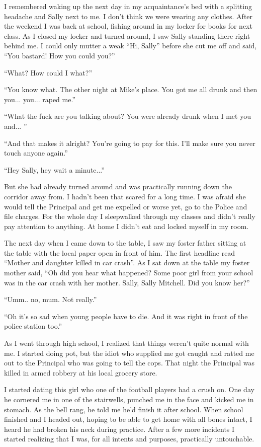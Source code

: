 \documentclass[11pt,letterpaper]{article}
\begin{document}
I remembered waking up the next day in my acquaintance's bed with a splitting headache and Sally next to me. I don't think we were wearing any clothes. After the weekend I was back at school, fishing around in my locker for books for next class. As I closed my locker and turned around, I saw Sally standing there right behind me. I could only mutter a weak ``Hi, Sally'' before she cut me off and said, ``You bastard! How you could you?''

``What? How could I what?''

``You know what. The other night at Mike's place. You got me all drunk and then you... you... raped me.''

``What the fuck are you talking about? You were already drunk when I met you and... ''

``And that makes it alright? You're going to pay for this. I'll make sure you never touch anyone again.''

``Hey Sally, hey wait a minute...''

But she had already turned around and was practically running down the corridor away from. I hadn't been that scared for a long time. I was afraid she would tell the Principal and get me expelled or worse yet, go to the Police and file charges. For the whole day I sleepwalked through my classes and didn't really pay attention to anything. At home I didn't eat and locked myself in my room.

The next day when I came down to the table, I saw my foster father sitting at the table with the local paper open in front of him. The first headline read ``Mother and daughter killed in car crash''. As I sat down at the table my foster mother said, ``Oh did you hear what happened? Some poor girl from your school was in the car crash with her mother. Sally, Sally Mitchell. Did you know her?''

``Umm.. no, mum. Not really.''

``Oh it's so sad when young people have to die. And it was right in front of the police station too.''


As I went through high school, I realized that things weren't quite normal with me. I started doing pot, but the idiot who supplied me got caught and ratted me out to the Principal who was going to tell the cops. That night the Principal was killed in armed robbery at his local grocery store. 

I started dating this girl who one of the football players had a crush on. One day he cornered me in one of the stairwells, punched me in the face and kicked me in stomach. As the bell rang, he told me he'd finish it after school. When school finished and I headed out, hoping to be able to get home with all bones intact, I heard he had broken his neck during practice. After a few more incidents I started realizing that I was, for all intents and purposes, practically untouchable.
\end{document}
